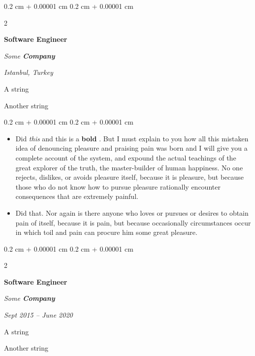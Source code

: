 \documentclass[10pt, letterpaper]{article}
\newenvironment{summary}{
    \begin{description}[
        topsep=0.10 cm,
        parsep=0.10 cm,
        partopsep=0pt,
        itemsep=0pt,
        leftmargin=0.4 cm + 10pt
    ]
}{
    \end{description}
} %
\newenvironment{highlights}{
    \begin{itemize}[
        topsep=0.10 cm,
        parsep=0.10 cm,
        partopsep=0pt,
        itemsep=0pt,
        leftmargin=0.4 cm + 10pt
    ]
}{
    \end{itemize}
} %
\newenvironment{onecolentry}{
    \begin{adjustwidth}{
        0.2 cm + 0.00001 cm
    }{
        0.2 cm + 0.00001 cm
    }
}{
    \end{adjustwidth}
} %
\newenvironment{twocolentry}[2][]{
    \onecolentry
    \def\secondColumn{#2}
    \setcolumnwidth{\fill, 4.5 cm}
    \begin{paracol}{2}
}{
    \switchcolumn \raggedleft \secondColumn
    \end{paracol}
    \endonecolentry
} %
\let\hrefWithoutArrow\href
\renewcommand{\href}[2]{\hrefWithoutArrow{#1}{\ifthenelse{\equal{#2}{}}{ }{#2 }\raisebox{.15ex}{\footnotesize \faExternalLink*}}}
\begin{document}
        \begin{twocolentry}{
        \textit{Istanbul, Turkey}    
            
        }
            \textbf{Software Engineer}
            
            \textit{Some \textbf{Company}}
        \end{twocolentry}
            \begin{summary}
                \item A string
                \item Another string
            \end{summary}
        \vspace{0.10 cm}
        \begin{onecolentry}
            \begin{highlights}
                \item Did \textit{this} and this is a \textbf{bold} \href{https://example.com}{link}. But I must explain to you how all this mistaken idea of denouncing pleasure and praising pain was born and I will give you a complete account of the system, and expound the actual teachings of the great explorer of the truth, the master-builder of human happiness. No one rejects, dislikes, or avoids pleasure itself, because it is pleasure, but because those who do not know how to pursue pleasure rationally encounter consequences that are extremely painful.
                \item Did that. Nor again is there anyone who loves or pursues or desires to obtain pain of itself, because it is pain, but because occasionally circumstances occur in which toil and pain can procure him some great pleasure.
            \end{highlights}
        \end{onecolentry}


        \vspace{0.2 cm}

        \begin{twocolentry}{
            
            
        \textit{Sept 2015 – June 2020}}
            \textbf{Software Engineer}
            
            \textit{Some \textbf{Company}}
        \end{twocolentry}
            \begin{summary}
                \item A string
                \item Another string
            \end{summary}
\end{document}

